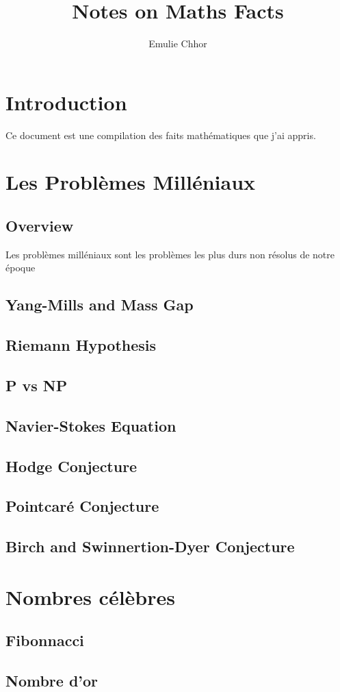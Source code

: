 \documentclass{article}
\begin{document}
\title{Notes on Maths Facts}
\author{Emulie Chhor}
\maketitle

\section*{Introduction}

Ce document est une compilation des faits mathématiques que j'ai appris.

\section{Les Problèmes Milléniaux}

\subsection{Overview}

Les problèmes milléniaux sont les problèmes les plus durs non résolus
de notre époque

\subsection{Yang-Mills and Mass Gap}
\subsection{Riemann Hypothesis}
\subsection{P vs NP}
\subsection{Navier-Stokes Equation}
\subsection{Hodge Conjecture}
\subsection{Pointcaré Conjecture}
\subsection{Birch and Swinnertion-Dyer Conjecture}

\section{Nombres célèbres}

\subsection{Fibonnacci}%
\label{sub:Fibonnacci}

\subsection{Nombre d'or}%
\label{sub:Nombre d'or}
\end{document}
